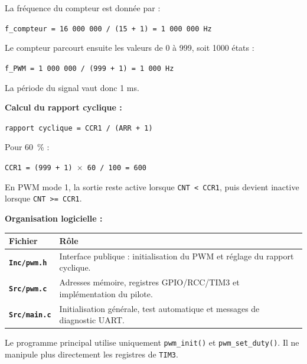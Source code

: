 \documentclass[11pt,a4paper]{article}
\begin{document}
\begin{sessionbox}
		La fréquence du compteur est donnée par :
		
		\begin{center}
			\texttt{f\_compteur = 16 000 000 / (15 + 1) = 1 000 000 Hz}
		\end{center}
		
		Le compteur parcourt ensuite les valeurs de 0 à 999, soit 1000 états :
		
		\begin{center}
			\texttt{f\_PWM = 1 000 000 / (999 + 1) = 1 000 Hz}
		\end{center}
		
		La période du signal vaut donc 1 ms.
		
		\vspace{0.3cm}
		
		\textbf{Calcul du rapport cyclique :}
		
		\begin{center}
			\texttt{rapport cyclique = CCR1 / (ARR + 1)}
		\end{center}
		
		Pour 60~\% :
		
		\begin{center}
			\texttt{CCR1 = (999 + 1) $\times$ 60 / 100 = 600}
		\end{center}
		
		En PWM mode 1, la sortie reste active lorsque \texttt{CNT < CCR1}, puis devient inactive lorsque \texttt{CNT >= CCR1}.
		
		\vspace{0.3cm}
		
		\textbf{Organisation logicielle :}
		
		\begin{center}
			\begin{tabular}{>{\bfseries}p{4cm}p{9cm}}
				\toprule
				Fichier & Rôle \\
				\midrule
				\texttt{Inc/pwm.h} & Interface publique : initialisation du PWM et réglage du rapport cyclique. \\
				\texttt{Src/pwm.c} & Adresses mémoire, registres GPIO/RCC/TIM3 et implémentation du pilote. \\
				\texttt{Src/main.c} & Initialisation générale, test automatique et messages de diagnostic UART. \\
				\bottomrule
			\end{tabular}
		\end{center}
		
		Le programme principal utilise uniquement \texttt{pwm\_init()} et \texttt{pwm\_set\_duty()}. Il ne manipule plus directement les registres de \texttt{TIM3}.
		

\end{sessionbox}
\end{document}
